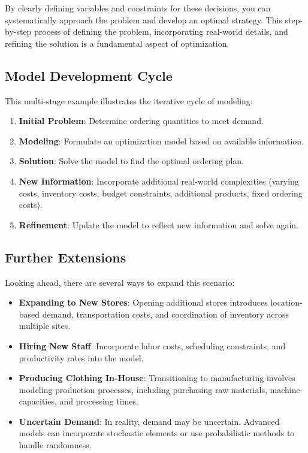 By clearly defining variables and constraints for these decisions, you can systematically approach the problem and develop an optimal strategy. This step-by-step process of defining the problem, incorporating real-world details, and refining the solution is a fundamental aspect of optimization.

\subsection*{Model Development Cycle}

This multi-stage example illustrates the iterative cycle of modeling:

\begin{enumerate}
    \item \textbf{Initial Problem}: Determine ordering quantities to meet demand.
    \item \textbf{Modeling}: Formulate an optimization model based on available information.
    \item \textbf{Solution}: Solve the model to find the optimal ordering plan.
    \item \textbf{New Information}: Incorporate additional real-world complexities (varying costs, inventory costs, budget constraints, additional products, fixed ordering costs).
    \item \textbf{Refinement}: Update the model to reflect new information and solve again.
\end{enumerate}

\subsection*{Further Extensions}

Looking ahead, there are several ways to expand this scenario:

\begin{itemize}
    \item \textbf{Expanding to New Stores}: Opening additional stores introduces location-based demand, transportation costs, and coordination of inventory across multiple sites.
    \item \textbf{Hiring New Staff}: Incorporate labor costs, scheduling constraints, and productivity rates into the model.
    \item \textbf{Producing Clothing In-House}: Transitioning to manufacturing involves modeling production processes, including purchasing raw materials, machine capacities, and processing times.
    \item \textbf{Uncertain Demand}: In reality, demand may be uncertain. Advanced models can incorporate stochastic elements or use probabilistic methods to handle randomness.
\end{itemize}

